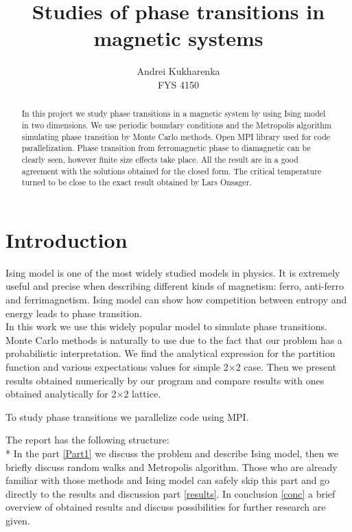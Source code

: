 \documentclass[10pt]{article}
\begin{document}
\setlength\parindent{1pt}
\title{Studies of phase transitions in magnetic systems}
\author{Andrei Kukharenka \\  
FYS 4150 
}

\maketitle
\begin{abstract}
In this project we study phase transitions in a magnetic system by using Ising model in two dimensions.
We use periodic boundary conditions and the Metropolis algorithm simulating phase transition by Monte Carlo methods.
Open MPI library used for code parallelization. Phase transition from ferromagnetic phase to diamagnetic can be clearly seen, however
finite size effects take place.
All the result are in a good agreement with the solutions obtained for the closed form. The critical temperature turned to be close to the exact result obtained by Lars Onsager. ​


\end{abstract}
\clearpage 


\section{Introduction}
Ising model is one of the most widely studied models in physics. It is extremely useful and precise when describing different kinds of magnetism: ferro, anti-ferro and ferrimagnetism. Ising model can show how competition between entropy and energy leads to phase transition. \\
In this work we use this widely popular model to simulate phase transitions. Monte Carlo methods is naturally to use due to the fact that our problem has a probabilistic interpretation.
We find the analytical expression for the partition function and various expectations values for simple 2$\times$2 case.
Then we present results obtained numerically by our program and compare results with ones obtained analytically for 2$\times$2 lattice.

To study phase transitions we parallelize code using MPI.

The report has the following structure:\\*
In the part \ref{Part1}  we discuss the problem and describe Ising model, then we briefly discuss random walks and Metropolis algorithm. Those who are already familiar with those methods and Ising model can safely skip this part and go directly to the results and discussion part \ref{results}. In conclusion \ref{conc} a brief overview of obtained results and discuss possibilities for further research are given. 
\end{document}
